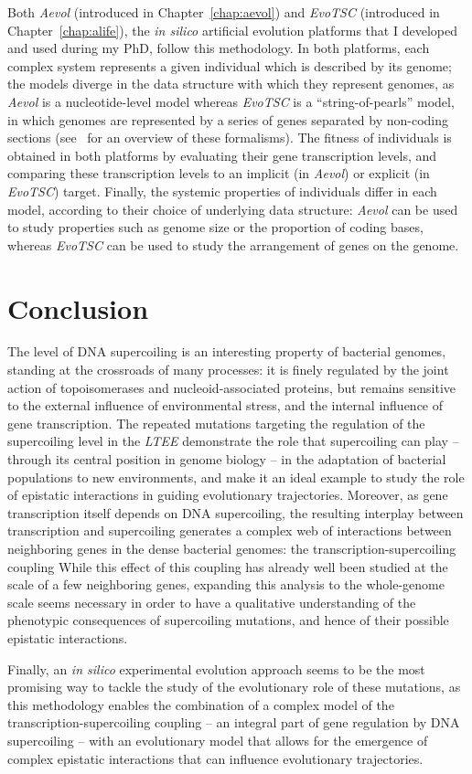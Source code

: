Both \emph{Aevol} (introduced in Chapter~\ref{chap:aevol}) and \emph{EvoTSC} (introduced in Chapter~\ref{chap:alife}), the \emph{in silico} artificial evolution platforms that I developed and used during my PhD, follow this methodology.
In both platforms, each complex system represents a given individual which is described by its genome; the models diverge in the data structure with which they represent genomes, as \emph{Aevol} is a nucleotide-level model whereas \emph{EvoTSC} is a ``string-of-pearls'' model, in which genomes are represented by a series of genes separated by non-coding sections (see~\cite{hindre2012} for an overview of these formalisms).
The fitness of individuals is obtained in both platforms by evaluating their gene transcription levels, and comparing these transcription levels to an implicit (in \emph{Aevol}) or explicit (in \emph{EvoTSC}) target.
Finally, the systemic properties of individuals differ in each model, according to their choice of underlying data structure: \emph{Aevol} can be used to study properties such as genome size or the proportion of coding bases, whereas \emph{EvoTSC} can be used to study the arrangement of genes on the genome.


\section{Conclusion}

The level of DNA supercoiling is an interesting property of bacterial genomes, standing at the crossroads of many processes: it is finely regulated by the joint action of topoisomerases and nucleoid-associated proteins, but remains sensitive to the external influence of environmental stress, and the internal influence of gene transcription.
The repeated mutations targeting the regulation of the supercoiling level in the \emph{LTEE} demonstrate the role that supercoiling can play -- through its central position in genome biology -- in the adaptation of bacterial populations to new environments, and make it an ideal example to study the role of epistatic interactions in guiding evolutionary trajectories.
Moreover, as gene transcription itself depends on DNA supercoiling, the resulting interplay between transcription and supercoiling generates a complex web of interactions between neighboring genes in the dense bacterial genomes: the transcription-supercoiling coupling
While this effect of this coupling has already well been studied at the scale of a few neighboring genes, expanding this analysis to the whole-genome scale seems necessary in order to have a qualitative understanding of the phenotypic consequences of supercoiling mutations, and hence of their possible epistatic interactions.

Finally, an \emph{in silico} experimental evolution approach seems to be the most promising way to tackle the study of the evolutionary role of these mutations, as this methodology enables the combination of a complex model of the transcription-supercoiling coupling -- an integral part of gene regulation by DNA supercoiling -- with an evolutionary model that allows for the emergence of complex epistatic interactions that can influence evolutionary trajectories.

